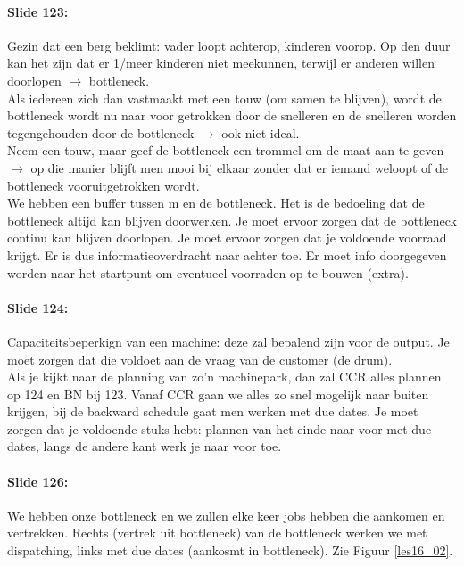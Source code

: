 \documentclass[10pt,a4paper]{report}
\begin{document}
\paragraph{Slide 123:} Gezin dat een berg beklimt: vader loopt achterop, kinderen voorop. Op den duur kan het zijn dat er 1/meer kinderen niet meekunnen, terwijl er anderen willen doorlopen $\rightarrow$ bottleneck.\\
Als iedereen zich dan vastmaakt met een touw (om samen te blijven), wordt de bottleneck wordt nu naar voor getrokken door de snelleren en de snelleren worden tegengehouden door de bottleneck $\rightarrow$ ook niet ideal.\\
Neem een touw, maar geef de bottleneck een trommel om de maat aan te geven $\rightarrow$ op die manier blijft men mooi bij elkaar zonder dat er iemand weloopt of de bottleneck vooruitgetrokken wordt.\\
We hebben een buffer tussen m en de bottleneck. Het is de bedoeling dat de bottleneck altijd kan blijven doorwerken. Je moet ervoor zorgen dat de bottleneck continu kan blijven doorlopen. Je moet ervoor zorgen dat je voldoende voorraad krijgt. Er is dus informatieoverdracht naar achter toe. Er moet info doorgegeven worden naar het startpunt om eventueel voorraden op te bouwen (extra).

\paragraph{Slide 124:} Capaciteitsbeperkign van een machine: deze zal bepalend zijn voor de output. Je moet zorgen dat die voldoet aan de vraag van de customer (de drum).\\
Als je kijkt naar de planning van zo'n machinepark, dan zal CCR alles plannen op 124 en BN bij 123. Vanaf CCR gaan we alles zo snel mogelijk naar buiten krijgen, bij de backward schedule gaat men werken met due dates. Je moet zorgen dat je voldoende stuks hebt: plannen van het einde naar voor met due dates, langs de andere kant werk je naar voor toe.

\paragraph{Slide 126:} We hebben onze bottleneck en we zullen elke keer jobs hebben die aankomen en vertrekken. Rechts (vertrek uit bottleneck) van de bottleneck werken we met dispatching, links met due dates (aankosmt in bottleneck). Zie Figuur \ref{les16_02}.\\
\end{document}
